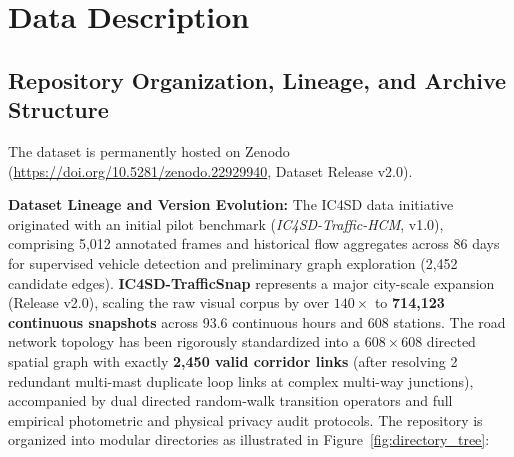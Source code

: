 \documentclass[preprint,12pt]{elsarticle}
\begin{document}
\section{Data Description}

\subsection{Repository Organization, Lineage, and Archive Structure}
The dataset is permanently hosted on Zenodo (\url{https://doi.org/10.5281/zenodo.22929940}, Dataset Release v2.0). 

\textbf{Dataset Lineage and Version Evolution:} The IC4SD data initiative originated with an initial pilot benchmark (\textit{IC4SD-Traffic-HCM}, v1.0), comprising 5,012 annotated frames and historical flow aggregates across 86 days for supervised vehicle detection and preliminary graph exploration (2,452 candidate edges). \textbf{IC4SD-TrafficSnap} represents a major city-scale expansion (Release v2.0), scaling the raw visual corpus by over $140\times$ to \textbf{714,123 continuous snapshots} across 93.6 continuous hours and 608 stations. The road network topology has been rigorously standardized into a $608 \times 608$ directed spatial graph with exactly \textbf{2,450 valid corridor links} (after resolving 2 redundant multi-mast duplicate loop links at complex multi-way junctions), accompanied by dual directed random-walk transition operators and full empirical photometric and physical privacy audit protocols. The repository is organized into modular directories as illustrated in Figure~\ref{fig:directory_tree}:
\end{document}
